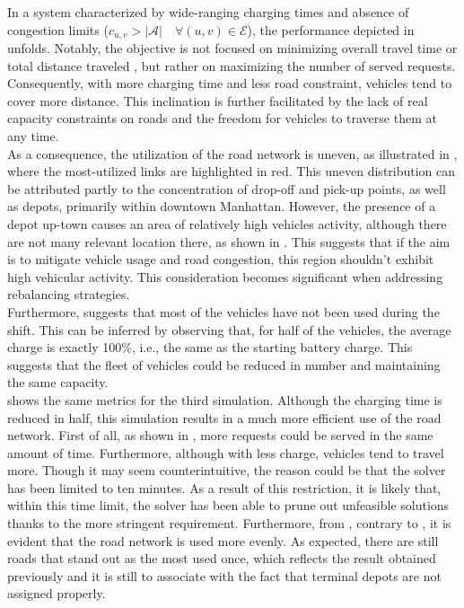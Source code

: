 In a system characterized by wide-ranging charging times and absence of congestion limits ($c_{u,v} > |\mathcal{A}| \quad \forall (u,v) \in \mathcal{E}$), the performance depicted in  unfolds. Notably, the objective is not focused on minimizing overall travel time  or total distance traveled , but rather on maximizing the number of served requests. Consequently, with more charging time and less road constraint, vehicles tend to cover more distance. This inclination is further facilitated by the lack of real capacity constraints on roads and the freedom for vehicles to traverse them at any time.\\
As a consequence, the utilization of the road network is uneven, as illustrated in , where the most-utilized links are highlighted in red. This uneven distribution can be attributed partly to the concentration of drop-off and pick-up points, as well as depots, primarily within downtown Manhattan. However, the presence of a depot up-town causes an area of relatively high vehicles activity, although there are not many relevant location there, as shown in . This suggests that if the aim is to mitigate vehicle usage and road congestion, this region shouldn't exhibit high vehicular activity. This consideration becomes significant when addressing rebalancing strategies. \\
Furthermore,  suggests that most of the vehicles have not been used during the shift. This can be inferred by observing that, for half of the vehicles, the average charge is exactly 100\%, i.e., the same as the starting battery charge. This suggests that the fleet of vehicles could be reduced in number and maintaining the same capacity. \\
 shows the same metrics for the third simulation. Although the charging time is reduced in half, this simulation results in a much more efficient use of the road network. First of all, as shown in , more requests could be served in the same amount of time. Furthermore, although with less charge, vehicles tend to travel more. Though it may seem counterintuitive, the reason could be that the solver has been limited to ten minutes. As a result of this restriction, it is likely that, within this time limit, the solver has been able to prune out unfeasible solutions thanks to the more stringent requirement. Furthermore, from , contrary to , it is evident that the road network is used more evenly. As expected, there are still roads that stand out as the most used once, which reflects the result obtained previously and it is still to associate with the fact that terminal depots are not assigned properly. 
